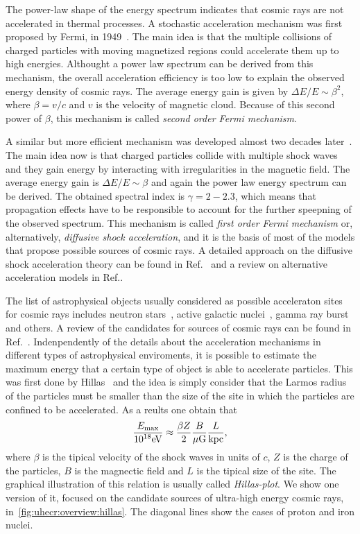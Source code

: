 The power-law shape of the energy spectrum indicates that
cosmic rays are not accelerated in thermal processes.
A stochastic acceleration mechanism was first proposed
by Fermi, in 1949~\cite{Fermi:1949ee}. The main idea is that
the multiple collisions of charged particles with moving magnetized regions
could accelerate them up to high energies. 
Althought a power law spectrum can be derived from this mechanism,
the overall acceleration efficiency is too low to explain the observed
energy density of cosmic rays. The average energy gain is given by $\Delta E/E\sim \beta^2$,
where $\beta = v/c$ and $v$ is the velocity of magnetic cloud.
Because of this second power of $\beta$, this mechanism is
called \emph{second order Fermi mechanism}.

A similar but more efficient mechanism was developed almost
two decades later~\cite{Axford1977,Krymsky1977,Bell:1978zc,Blandford:1978ky}.
The main idea now is that charged particles collide with multiple shock waves
and they gain energy by interacting with irregularities in the magnetic field.
The average energy gain is $\Delta E/E\sim \beta$ and again the power law energy
spectrum can be derived. The obtained spectral index is $\gamma=2-2.3$, which means that
propagation effects have to be responsible to account for the further speepning
of the observed spectrum.
This mechanism is called \emph{first order Fermi mechanism} or, alternatively,
\emph{diffusive shock acceleration}, and it is the basis of most of the models
that propose possible sources of cosmic rays.
A detailed approach on the diffusive shock acceleration theory can be found
in Ref.~\cite{Drury:1983zz} and a review on alternative acceleration
models in Ref.\cite{}.

The list of astrophysical objects usually considered as possible
acceleraton sites for cosmic rays includes neutron stars~\cite{Fang:2012rx},
active galactic nuclei~\cite{}, gamma ray burst~\cite{Vietri1995,Waxman:2004ez}
and others. A review of the candidates
for sources of cosmic rays can be found in Ref.~\cite{Torres:2004hk}.
Indenpendently of the details about the acceleration mechanisms in different
types of astrophysical enviroments, it is possible to estimate the maximum energy
that a certain type of object is able to accelerate particles. This was first done
by Hillas~\cite{Hillas1984} and the idea is simply consider that
the Larmos radius of the particles must be smaller than the size of the site
in which the particles are confined to be accelerated. As a reults one obtain that
\begin{equation}
  \frac{E_\text{max}}{\mbox{$10^{18}$} \mbox{e\kern-0.1em V}} \approx \frac{\beta Z}{2} \frac{B}{\mu\text{G}}\frac{L}{\text{kpc}},
\end{equation}
where $\beta$ is the tipical velocity of the shock waves in units of $c$, $Z$ is the charge
of the particles, $B$ is the magnectic field and $L$ is the tipical size of the site.
The graphical illustration of this relation is usually called \emph{Hillas-plot}.
We show one version of it, focused on the candidate sources of ultra-high energy
cosmic rays, in~\cref{fig:uhecr:overview:hillas}.
The diagonal lines show the cases of  proton and iron nuclei.

